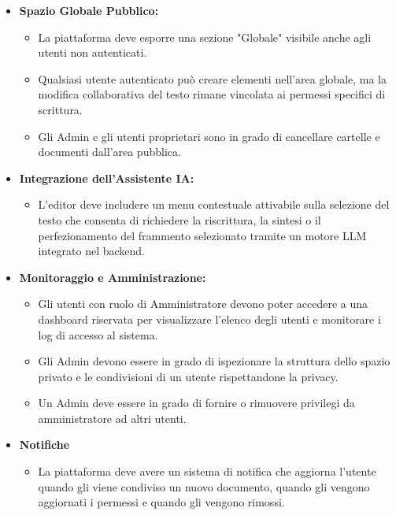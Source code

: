 \documentclass[11pt,a4paper]{report}
\begin{document}
\begin{itemize}
    \item \textbf{Spazio Globale Pubblico:}
    \begin{itemize}
        \item La piattaforma deve esporre una sezione "Globale" visibile anche agli utenti non autenticati.
        \item Qualsiasi utente autenticato può creare elementi nell'area globale, ma la modifica collaborativa del testo rimane vincolata ai permessi specifici di scrittura.
        \item Gli Admin e gli utenti proprietari sono in grado di cancellare cartelle e documenti dall'area pubblica.
    \end{itemize}
    
    \item \textbf{Integrazione dell'Assistente IA:}
    \begin{itemize}
        \item L'editor deve includere un menu contestuale attivabile sulla selezione del testo che consenta di richiedere la riscrittura, la sintesi o il perfezionamento del frammento selezionato tramite un motore LLM integrato nel backend.
    \end{itemize}
    
    \item \textbf{Monitoraggio e Amministrazione:}
    \begin{itemize}
        \item Gli utenti con ruolo di Amministratore devono poter accedere a una dashboard riservata per visualizzare l'elenco degli utenti e monitorare i log di accesso al sistema.
        \item Gli Admin devono essere in grado di ispezionare la struttura dello spazio privato e le condivisioni di un utente rispettandone la privacy.
        \item Un Admin deve essere in grado di fornire o rimuovere privilegi da amministratore ad altri utenti.
    \end{itemize}
    \item \textbf{Notifiche}
    \begin{itemize}
        \item La piattaforma deve avere un sistema di notifica che aggiorna l'utente quando gli viene condiviso un nuovo documento, quando gli vengono aggiornati i permessi e quando gli vengono rimossi.
    \end{itemize}
\end{itemize}
\end{document}
